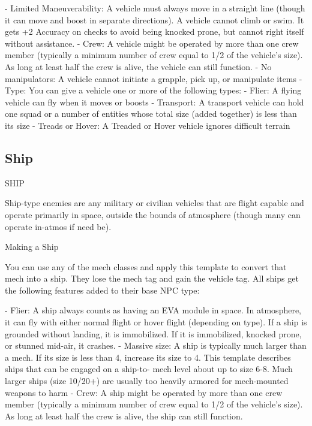     -    Limited Maneuverability: A vehicle must always move in a straight line (though it can  
         move and boost in separate directions). A vehicle cannot climb or swim. It gets +2  
        Accuracy on checks to avoid being knocked prone, but cannot right itself without  
        assistance.  
    -   Crew: A vehicle might be operated by more than one crew member (typically a minimum  
         number of crew equal to 1/2 of the vehicle’s size). As long at least half the crew is alive, the  
        vehicle can still function.  
    -    No manipulators: A vehicle cannot initiate a grapple, pick up, or manipulate items  
    -   Type: You can give a vehicle one or more of the following types:  
             -   Flier: A flying vehicle can fly when it moves or boosts  
             -   Transport: A transport vehicle can hold one squad or a number of entities whose  
                 total size (added together) is less than its size  
             -   Treads or Hover: A Treaded or Hover vehicle ignores difficult terrain  
\subsection{Ship}
                                                    SHIP   

Ship-type enemies are any military or civilian vehicles that are flight capable and operate primarily  
in space, outside the bounds of atmosphere (though many can operate in-atmos if need be).
 

Making a Ship
 
You can use any of the mech classes and apply this template to convert that mech into a ship.  
They lose the mech tag and gain the vehicle tag. All ships get the following features added to  
their base NPC type:
 
    -    Flier: A ship always counts as having an EVA module in space. In atmosphere, it can fly  
        with either normal flight or hover flight (depending on type). If a ship is grounded without  
         landing, it is immobilized. If it is immobilized, knocked prone, or stunned mid-air, it  
        crashes.  
    -    Massive size: A ship is typically much larger than a mech. If its size is less than 4,  
         increase its size to 4. This template describes ships that can be engaged on a ship-to- 
         mech level about up to size 6-8. Much larger ships (size 10/20+) are usually too heavily  
        armored for mech-mounted weapons to harm  
    -   Crew: A ship might be operated by more than one crew member (typically a minimum  
         number of crew equal to 1/2 of the vehicle’s size). As long at least half the crew is alive, the  
        ship can still function.
 
